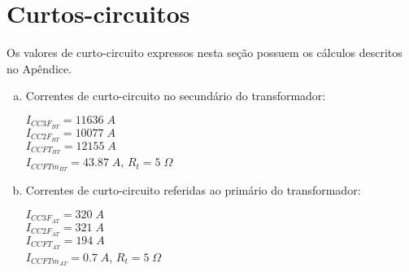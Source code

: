 \section{Curtos-circuitos}

Os valores de curto-circuito expressos nesta seção possuem os cálculos descritos no Apêndice.

\begin{enumerate}[(a)]
    \item Correntes de curto-circuito no secundário do transformador:
    
    $I_{CC3F_{BT}} = 11636 \; A$ \\
    $I_{CC2F_{BT}} = 10077 \; A$ \\
    $I_{CCFT_{BT}} = 12155 \; A$ \\
    $I_{CCFTm_{BT}} = 43.87 \; A$, $R_t = 5 \; \Omega$ 
    
    \item Correntes de curto-circuito referidas ao primário do transformador:
    
    $I_{CC3F_{AT}} = 320 \; A$ \\
    $I_{CC2F_{AT}} = 321 \; A$ \\
    $I_{CCFT_{AT}} = 194 \; A$ \\
    $I_{CCFTm_{AT}} = 0.7 \; A$, $R_t = 5 \; \Omega$ 
\end{enumerate}
